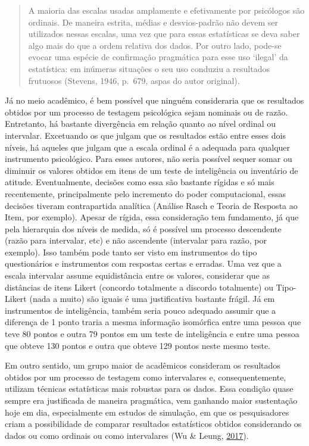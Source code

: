 \documentclass[
]{book}
\begin{document}
\begin{quote}
A maioria das escalas usadas amplamente e efetivamente por psicólogos
são ordinais. De maneira estrita, médias e desvios-padrão não devem ser
utilizados nessas escalas, uma vez que para essas estatísticas se deva
saber algo mais do que a ordem relativa dos dados. Por outro lado,
pode-se evocar uma espécie de confirmação pragmática para esse uso
`ilegal' da estatística: em inúmeras situações o seu uso conduziu a
resultados frutuosos (Stevens, 1946, p.~679, aspas do autor original).
\end{quote}

Já no meio acadêmico, é bem possível que ninguém consideraria que os
resultados obtidos por um processo de testagem psicológica sejam
nominais ou de razão. Entretanto, há bastante divergência em relação
quanto ao nível ordinal ou intervalar. Excetuando os que julgam que os
resultados estão entre esses dois níveis, há aqueles que julgam que a
escala ordinal é a adequada para qualquer instrumento psicológico. Para
esses autores, não seria possível sequer somar ou diminuir os valores
obtidos em itens de um teste de inteligência ou inventário de atitude.
Eventualmente, decisões como essa são bastante rígidas e só mais
recentemente, principalmente pelo incremento do poder computacional,
essas decisões tiveram contrapartida analítica (Análise Rasch e Teoria
de Resposta ao Item, por exemplo). Apesar de rígida, essa consideração
tem fundamento, já que pela hierarquia dos níveis de medida, só é
possível um processo descendente (razão para intervalar, etc) e não
ascendente (intervalar para razão, por exemplo). Isso também pode tanto
ser visto em instrumentos do tipo questionários e instrumentos com
respostas certas e erradas. Uma vez que a escala intervalar assume
equidistância entre os valores, considerar que as distâncias de itens
Likert (concordo totalmente a discordo totalmente) ou Tipo-Likert (nada
a muito) são iguais é uma justificativa bastante frágil. Já em
instrumentos de inteligência, também seria pouco adequado assumir que a
diferença de 1 ponto traria a mesma informação isomórfica entre uma
pessoa que teve 80 pontos e outra 79 pontos em um teste de inteligência
e entre uma pessoa que obteve 130 pontos e outra que obteve 129 pontos
neste mesmo teste.

Em outro sentido, um grupo maior de acadêmicos consideram os resultados
obtidos por um processo de testagem como intervalares e,
consequentemente, utilizam técnicas estatísticas mais robustas para os
dados. Essa condição quase sempre era justificada de maneira pragmática,
vem ganhando maior sustentação hoje em dia, especialmente em estudos de
simulação, em que os pesquisadores criam a possibilidade de comparar
resultados estatísticos obtidos considerando os dados ou como ordinais
ou como intervalares (Wu \& Leung,
\protect\hyperlink{ref-Wu2017}{2017}).
\end{document}
